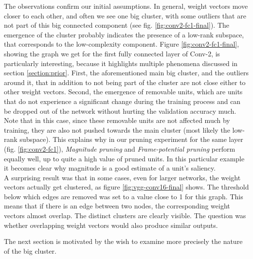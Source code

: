 The observations confirm our initial assumptions. In general, weight vectors move closer to each other, and often we see one big cluster, with some outliers that are not part of this big connected component (see fig. \ref{fig:conv2-fc1-final}). The emergence of the cluster probably indicates the presence of a low-rank subspace, that corresponds to the low-complexity component. Figure \ref{fig:conv2-fc1-final}, showing the graph we get for the first fully connected layer of Conv-2, is particularly interesting, because it highlights multiple phenomena discussed in section \ref{section:prior}. First, the aforementioned main big cluster, and the outliers around it, that in addition to not being part of the cluster are not close either to other weight vectors. Second, the emergence of removable units, which are units that do not experience a significant change during the training process and can be dropped out of the network without hurting the validation accuracy much. Note that in this case, since these removable units are not affected much by training, they are also not pushed towards the main cluster (most likely the low-rank subspace). This explains why in our pruning experiment for the same layer (fig. \ref{fig:conv2-fc1}), \textit{Magnitude pruning} and \textit{Frame-potential pruning} perform equally well, up to quite a high value of pruned units. In this particular example it becomes clear why magnitude is a good estimate of a unit's saliency. \\

A surprising result was that in some cases, even for larger networks, the weight vectors actually get clustered, as figure \ref{fig:vgg-conv16-final} shows. The threshold below which edges are removed was set to a value close to 1 for this graph. This means that if there is an edge between two nodes, the corresponding weight vectors almost overlap. The distinct clusters are clearly visible. The question was whether overlapping weight vectors would also produce similar outputs. 


The next section is motivated by the wish to examine more precisely the nature of the big cluster.  \\

